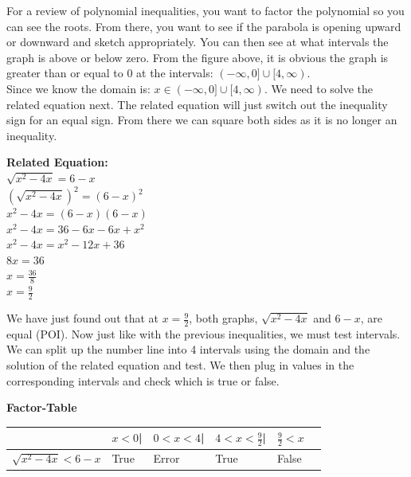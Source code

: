 \documentclass[12pt,fleqn]{book} %
\begin{document}
\vspace*{-7mm}

\noindent For a review of polynomial inequalities, you want to factor the polynomial so you can see the roots. From there, you want to see if the parabola is opening upward or downward and sketch appropriately. You can then see at what intervals the graph is above or below zero. From the figure above, it is obvious the graph is greater than or equal to 0 at the intervals: $(-\infty,0]\cup[4,\infty)$.\\

\noindent Since we know the domain is: $x\in(-\infty,0]\cup[4,\infty)$. We need to solve the related equation next. The related equation will just switch out the inequality sign for an equal sign. From there we can square both sides as it is no longer an inequality.

\begin{center}
    \textbf{Related Equation:}\\
    \Large{$\sqrt{x^2-4x}=6-x$}\\
    \Large{$(\sqrt{x^2-4x})^2=(6-x)^2$}\\
    \Large{$x^2-4x=(6-x)(6-x)$}\\
    \Large{$x^2-4x=36-6x-6x+x^2$}\\
    \Large{$x^2-4x=x^2-12x+36$}\\
    \Large{$8x=36$}\\
    \Large{$x=\frac{36}{8}$}\\
    \Large{$x=\frac{9}{2}$}\\
\end{center}

\noindent We have just found out that at $x=\frac{9}{2}$, both graphs, $\sqrt{x^2-4x}$ and $6-x$, are equal (POI). Now just like with the previous inequalities, we must test intervals. We can split up the number line into 4 intervals using the domain and the solution of the related equation and test. We then plug in values in the corresponding intervals and check which is true or false. 

\begin{center}
\textbf{Factor-Table}
\begin{table}[h]
\centering
\begin{tabular}{l l l l l l}
\toprule
\textbf{} & \textbf{$x<0$\hspace{3mm}|} & \textbf{$0<x<4$\hspace{5mm}|} & \textbf{$4< x<\frac{9}{2}$\hspace{5mm}|} & \textbf{$\frac{9}{2}<x$}\\
\midrule
{$\sqrt{x^2-4x}<6-x$} & \hspace{5mm}True & \hspace{5mm}Error & \hspace{5mm}True & \hspace{3mm}False &\\
\bottomrule
\end{tabular}
\end{table}
\end{center}
\end{document}
